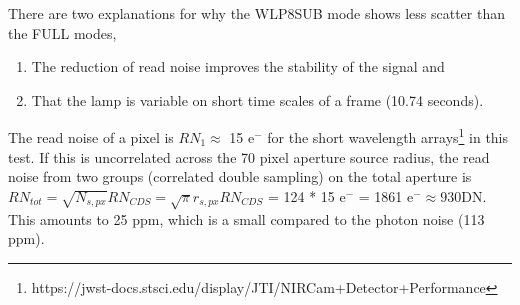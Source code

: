 \documentclass{aastex62}
\begin{document}
There are two explanations for why the WLP8SUB mode shows less scatter than the FULL modes, 
\begin{enumerate}[noitemsep]
	\item The reduction of read noise improves the stability of the signal and\label{item:readNReasonCV3subFull}
	\item That the lamp is variable on short time scales of a frame (10.74 seconds).\label{item:lampReasonCV3subFull}
\end{enumerate}
The read noise of a pixel is $RN_1 \approx$ 15 e$^-$ for the short wavelength arrays\footnote{https://jwst-docs.stsci.edu/display/JTI/NIRCam+Detector+Performance} in this test.
If this is uncorrelated across the 70 pixel aperture source radius, the read noise from two groups  (correlated double sampling) on the total aperture is $RN_{tot} = \sqrt{N_{s,px}} RN_{CDS} = \sqrt{\pi} r_{s,px} RN_{CDS}$ = 124 * 15 e$^-$ = 1861 e$^- \approx 930 $DN.
This amounts to 25 ppm, which is a small compared to the photon noise (113 ppm).
\end{document}
